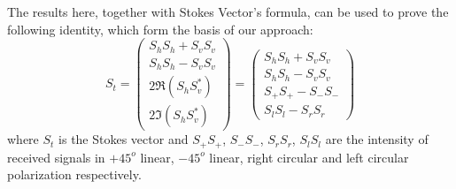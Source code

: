 The results here, together with Stokes Vector's formula, can be used to prove the following identity, which form the basis of our approach:
\begin{equation}
S_t = 
\left(
	\begin{array} {c}
		S_hS_h + S_vS_v \\
		S_hS_h - S_vS_v \\
		2 \Re{(S_hS_v^*)} \\
		2 \Im{(S_hS_v^*)}
	\end{array}
\right)
= 
\left(
	\begin{array} {c}
		S_hS_h + S_vS_v \\
		S_hS_h - S_vS_v \\
		S_+S_+ - S_-S_- \\
		S_lS_l - S_rS_r
	\end{array}
\right)
\end{equation}
where $S_t$ is the Stokes vector and $S_+S_+$, $S_-S_-$, $S_rS_r$, $S_lS_l$ are the intensity of received signals in $+45^o$ linear, $-45^o$ linear, right circular and left circular polarization respectively.

%


